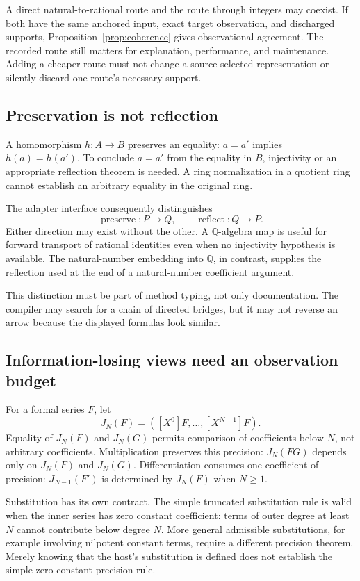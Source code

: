 \documentclass[11pt,a4paper]{article}
\newcommand{\Q}{\mathbb Q}
\theoremstyle{definition}
\begin{document}
A direct natural-to-rational route and the route through integers may coexist.
If both have the same anchored input, exact target observation, and discharged
supports, Proposition~\ref{prop:coherence} gives observational agreement. The
recorded route still matters for explanation, performance, and maintenance.
Adding a cheaper route must not change a source-selected representation or
silently discard one route's necessary support.

\subsection{Preservation is not reflection}
A homomorphism \(h:A\to B\) preserves an equality: \(a=a'\) implies
\(h(a)=h(a')\). To conclude \(a=a'\) from the equality in \(B\), injectivity or an
appropriate reflection theorem is needed. A ring normalization in a quotient
ring cannot establish an arbitrary equality in the original ring.

The adapter interface consequently distinguishes
\[
 \operatorname{preserve}:P\to Q,
 \qquad
 \operatorname{reflect}:Q\to P.
\]
Either direction may exist without the other. A \(\Q\)-algebra map is useful for
forward transport of rational identities even when no injectivity hypothesis is
available. The natural-number embedding into \(\Q\), in contrast, supplies the
reflection used at the end of a natural-number coefficient argument.

This distinction must be part of method typing, not only documentation. The
compiler may search for a chain of directed bridges, but it may not reverse an
arrow because the displayed formulas look similar.

\subsection{Information-losing views need an observation budget}
For a formal series \(F\), let
\[
 J_N(F)=([X^0]F,\ldots,[X^{N-1}]F).
\]
Equality of \(J_N(F)\) and \(J_N(G)\) permits comparison of coefficients below
\(N\), not arbitrary coefficients. Multiplication preserves this precision:
\(J_N(FG)\) depends only on \(J_N(F)\) and \(J_N(G)\). Differentiation consumes
one coefficient of precision: \(J_{N-1}(F')\) is determined by \(J_N(F)\) when
\(N\geq1\).

Substitution has its own contract. The simple truncated substitution rule is
valid when the inner series has zero constant coefficient: terms of outer degree
at least \(N\) cannot contribute below degree \(N\). More general admissible
substitutions, for example involving nilpotent constant terms, require a different
precision theorem. Merely knowing that the host's substitution is defined does
not establish the simple zero-constant precision rule.
\end{document}
